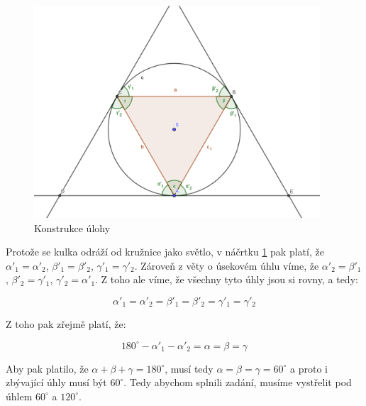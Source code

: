 \documentclass{fkssolpub}
\author{Ondřej Sedláček}
\begin{document}
\begin{figure}
	\begin{center}
		\includegraphics[width=0.95\textwidth]{A-fig}
	\end{center}
	\caption{Konstrukce úlohy}
	\label{fig:1}
\end{figure}

Protože se kulka odráží od kružnice jako světlo, v náčrtku \ref{fig:1} pak platí, že $\alpha'_1 = \alpha'_2$, $\beta'_1 = \beta'_2$, $\gamma'_1 = \gamma'_2$. Zároveň z věty o úsekovém úhlu víme, že $\alpha'_2 = \beta'_1$, $\beta'_2 = \gamma'_1$, $\gamma'_2 = \alpha'_1$. Z toho ale víme, že všechny tyto úhly jsou si rovny, a tedy:

\[
	\alpha'_1 = \alpha'_2 = \beta'_1 = \beta'_2 = \gamma'_1 = \gamma'_2
\]

Z toho pak zřejmě platí, že:

\[
	180^{\circ} - \alpha'_1 - \alpha'_2 = \alpha = \beta = \gamma
\]

Aby pak platilo, že $\alpha + \beta + \gamma = 180^{\circ}$, musí tedy $\alpha = \beta = \gamma = 60 ^{\circ}$ a proto i zbývající úhly musí být $60^{\circ}$. Tedy abychom splnili zadání, musíme vystřelit pod úhlem $60 ^{\circ}$ a $120^{\circ}$.
\end{document}
